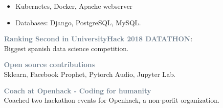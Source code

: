\begin{itemize}
    \item Kubernetes, Docker, Apache webserver
    \item Databases: Django, PostgreSQL, MySQL. 
\end{itemize}



\textcolor{SlateGrey}{\textbf{Ranking Second in UniversityHack 2018 DATATHON}}: \\ Biggest spanish data science competition.
\newline


\vspace{1pt}

\textcolor{SlateGrey}{\textbf{Open source contributions}} \\ Sklearn, Facebook Prophet, Pytorch Audio, Jupyter Lab.
\newline


\vspace{1pt}

\textcolor{SlateGrey}{\textbf{Coach at Openhack - Coding for humanity}} \\ Coached two hackathon events for Openhack, a non-porfit organization.



